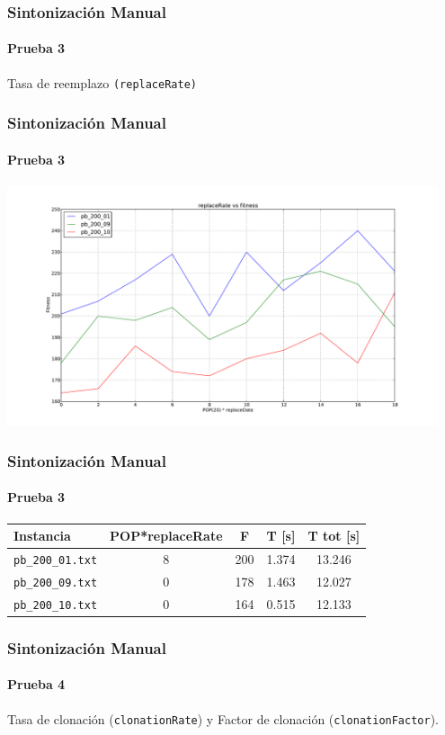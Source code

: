 \frame
{
\frametitle{Sintonización Manual}
\framesubtitle{Prueba 3}

\vspace{1cm}
\begin{center}
	Tasa de reemplazo \texttt{(replaceRate)}
\end{center}
}

\frame
{
\frametitle{Sintonización Manual}
\framesubtitle{Prueba 3}

\begin{center}
	\includegraphics[width=0.95\textwidth]{../doc/img/3.pdf}
\end{center}
}


\frame
{
\frametitle{Sintonización Manual}
\framesubtitle{Prueba 3}
\begin{center}
\begin{tabular}{|l|c|c|c|c|}
    \hline
    \textbf{Instancia} & \textbf{POP*replaceRate} & \textbf{F} & \textbf{T [s]} & \textbf{T tot [s]}\\\hline
    \texttt{pb\_200\_01.txt} & 8 & 200 & 1.374 & 13.246 \\\hline
    \texttt{pb\_200\_09.txt} & 0 & 178 & 1.463 & 12.027 \\\hline
    \texttt{pb\_200\_10.txt} & 0 & 164 & 0.515 & 12.133   \\\hline
\end{tabular}
\end{center}

}

\frame
{
\frametitle{Sintonización Manual}
\framesubtitle{Prueba 4}

\vspace{1cm}
\begin{center}
	Tasa de clonación (\texttt{clonationRate}) y Factor de clonación (\texttt{clonationFactor}).
\end{center}
}

